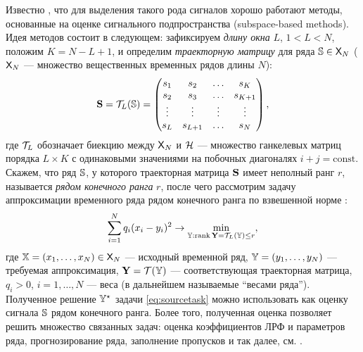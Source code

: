 \documentclass[10pt]{article}
\def\rank{\mathop{\mathrm{rank}}}
\begin{document}
Известно \cite{Broomhead.King1986, Vautard.etal1992, Elsner.Tsonis1996, Golyandina.etal2001}, что для выделения такого рода сигналов хорошо работают методы, основанные на оценке сигнального подпространства (subspace-based methods). Идея методов состоит в следующем: зафиксируем \emph{длину окна} $L$, $1 < L < N$, положим $K = N - L + 1$, и определим \emph{траекторную матрицу} для ряда $\mathbb{S} \in \mathsf{X}_N$ ($\mathsf{X}_N$ --- множество вещественных временных рядов длины $N$):
\begin{equation*}
\mathbf{S} = \mathcal{T}_L(\mathbb{S}) =  \begin{pmatrix}
s_1 & s_2 & \ldots & s_K \\
s_2 & s_3 & \ldots & s_{K + 1} \\
\vdots & \vdots & \vdots & \vdots \\
s_L & s_{L + 1} & \ldots & s_N
\end{pmatrix},
\end{equation*}
где $\mathcal{T}_L$ обозначает биекцию между $\mathsf{X}_N$ и $\mathcal{H}$ --- множество ганкелевых матриц порядка $L \times K$ с одинаковыми значениями на побочных диагоналях $i+j=\mathrm{const}$.
Скажем, что ряд $\mathbb{S}$, у которого траекторная матрица $\mathbf{S}$ имеет неполный ранг $r$, называется \emph{рядом конечного ранга} $r$, после чего рассмотрим задачу аппроксимации временного ряда рядом конечного ранга по взвешенной норме \cite{Zvonarev2015, Gillard2014}:
\begin{equation}\label{eq:sourcetask}
\sum_{i = 1}^N q_i (x_i - y_i)^2 \to \min_{\tsY: \rank \bfY  = \calT_L(\tsY) \le r},
\end{equation}
где $\mathbb{X} = (x_1, \ldots, x_N) \in \mathsf{X}_N$ --- исходный временной ряд, $\mathbb{Y} = (y_1, \ldots, y_N)$ --- требуемая аппроксимация, $\mathbf{Y} = \mathcal{T}(\mathbb{Y})$ --- соответствующая траекторная матрица, $q_i > 0$, $i = 1, \ldots, N$ --- веса (в дальнейшем называемые ``весами ряда''). 
Полученное решение $\mathbb{Y}^\star$ задачи \eqref{eq:sourcetask} можно использовать как оценку сигнала $\mathbb{S}$ рядом конечного ранга. Более того, полученная оценка позволяет решить множество связанных задач: оценка коэффициентов ЛРФ и параметров ряда, прогнозирование ряда, заполнение пропусков и так далее, см. \cite{Golyandina.etal2001}.
\end{document}
